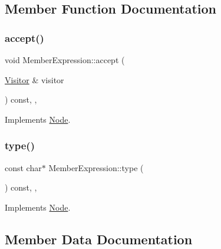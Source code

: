 \subsection{Member Function Documentation}
\mbox{\label{struct_member_expression_a04c3360eda4db02e733746882830b92c}} 
\subsubsection{\texorpdfstring{accept()}{accept()}}
{\footnotesize\ttfamily void Member\+Expression\+::accept (\begin{DoxyParamCaption}\item[{\hyperlink{struct_visitor}{Visitor} \&}]{visitor }\end{DoxyParamCaption}) const\hspace{0.3cm}{\ttfamily [inline]}, {\ttfamily [override]}, {\ttfamily [virtual]}}



Implements \hyperlink{struct_node_a10bd7af968140bbf5fa461298a969c71}{Node}.

\mbox{\label{struct_member_expression_a2b3653ea6c4b7447d3eebf21d528d847}} 
\subsubsection{\texorpdfstring{type()}{type()}}
{\footnotesize\ttfamily const char$\ast$ Member\+Expression\+::type (\begin{DoxyParamCaption}{ }\end{DoxyParamCaption}) const\hspace{0.3cm}{\ttfamily [inline]}, {\ttfamily [override]}, {\ttfamily [virtual]}}



Implements \hyperlink{struct_node_a82f29420d0a38efcc370352528e94e9b}{Node}.



\subsection{Member Data Documentation}
\mbox{\label{struct_member_expression_a338f9515daed926c07fd717b9b728f58}} 
